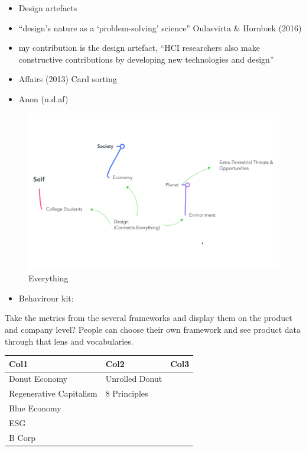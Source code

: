 \documentclass[
  letterpaper,
  DIV=11,
  numbers=noendperiod]{scrartcl}
\providecommand{\tightlist}{%
  \setlength{\itemsep}{0pt}\setlength{\parskip}{0pt}}\usepackage{longtable,booktabs,array}
\begin{document}
\begin{itemize}
\item
  Design artefacts
\item
  ``design's nature as a `problem-solving' science'' Oulasvirta \&
  Hornbæk (2016)
\item
  my contribution is the design artefact, ``HCI researchers also make
  constructive contributions by developing new technologies and design''
\item
  Affairs (2013) Card sorting
\item
  Anon (n.d.af)
\end{itemize}

\begin{figure}[H]

{\centering \includegraphics[width=1\linewidth,height=\textheight,keepaspectratio]{./images/discussion/everything.png}

}

\caption{Everything}

\end{figure}%

\begin{itemize}
\tightlist
\item
  Behavirour kit:
\end{itemize}

Take the metrics from the several frameworks and display them on the
product and company level? People can choose their own framework and see
product data through that lens and vocabularies.

\begin{longtable}[]{@{}lll@{}}
\toprule\noalign{}
Col1 & Col2 & Col3 \\
\midrule\noalign{}
\endhead
\bottomrule\noalign{}
\endlastfoot
Donut Economy & Unrolled Donut & \\
Regenerative Capitalism & 8 Principles & \\
Blue Economy & & \\
ESG & & \\
B Corp & & \\
\end{longtable}
\end{document}
